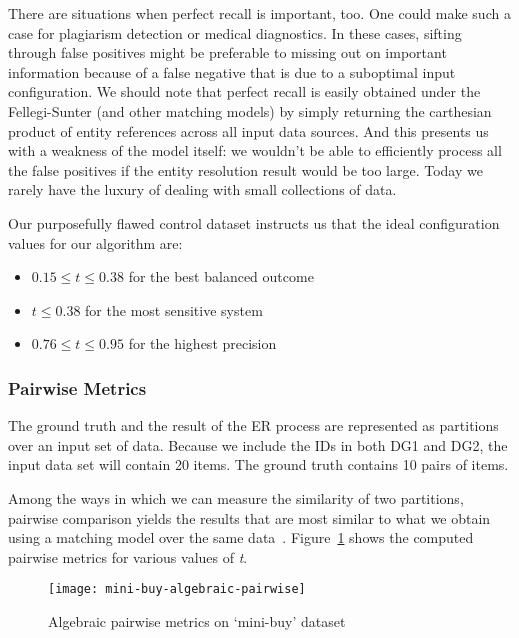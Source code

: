 There are situations when perfect recall is important, too.
One could make such a case for plagiarism detection or medical diagnostics.
In these cases, sifting through false positives might be preferable to missing
out on important information because of a false negative that is due to a
suboptimal input configuration.
We should note that perfect recall is easily obtained under the Fellegi-Sunter
(and other matching models) by simply returning the carthesian product of
entity references across all input data sources.
And this presents us with a weakness of the model itself: we wouldn't be able to
efficiently process all the false positives if the entity resolution result
would be too large.
Today we rarely have the luxury of dealing with small collections of data.

Our purposefully flawed control dataset instructs us that the ideal configuration
values for our algorithm are:

\begin{itemize}
    \item $0.15 \leq t \leq 0.38$ for the best balanced outcome
    \item $t \leq 0.38$ for the most sensitive system
    \item $0.76 \leq t \leq 0.95$ for the highest precision
\end{itemize}

\subsubsection{Pairwise Metrics}\label{subsubsec:Pairwise Results}

The ground truth and the result of the ER process are represented as partitions
over an input set of data.
Because we include the IDs in both DG1 and DG2, the input data set will
contain 20 items.
The ground truth contains 10 pairs of items.

Among the ways in which we can measure the similarity of two partitions,
pairwise comparison yields the results that are most similar to what we obtain
using a matching model over the same data~\cite{Men10}.
Figure~\ref{fig:mini-alg-pairwise} shows the computed pairwise metrics for
various values of \textit{t}.

\begin{figure}[htbp]
    \centering
    \captionsetup{justification=centering}
    \texttt{[image: mini-buy-algebraic-pairwise]}
    \caption{Algebraic pairwise metrics on `mini-buy' dataset}\label{fig:mini-alg-pairwise}
\end{figure}

